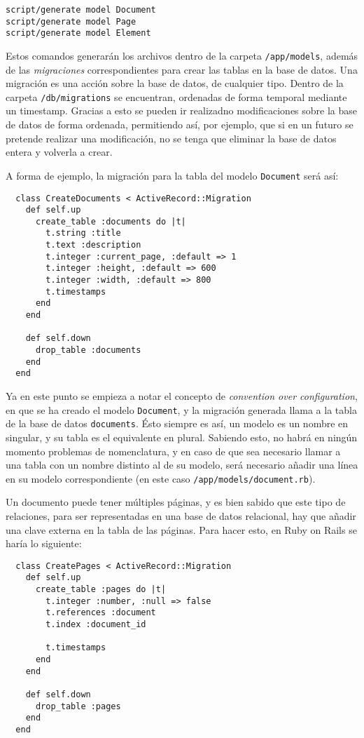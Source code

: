 \begin{verbatim}
script/generate model Document
script/generate model Page
script/generate model Element
\end{verbatim}

Estos comandos generarán los archivos dentro de la carpeta \texttt{/app/models}, además de las \emph{migraciones} correspondientes para crear las tablas en la base de datos. Una migración es una acción sobre la base de datos, de cualquier tipo. Dentro de la carpeta \texttt{/db/migrations} se encuentran, ordenadas de forma temporal mediante un timestamp. Gracias a esto se pueden ir realizadno modificaciones sobre la base de datos de forma ordenada, permitiendo así, por ejemplo, que si en un futuro se pretende realizar una modificación, no se tenga que eliminar la base de datos entera y volverla a crear.

A forma de ejemplo, la migración para la tabla del modelo \texttt{Document} será así:

\begin{verbatim}
  class CreateDocuments < ActiveRecord::Migration
    def self.up
      create_table :documents do |t|
        t.string :title
        t.text :description
        t.integer :current_page, :default => 1
        t.integer :height, :default => 600
        t.integer :width, :default => 800
        t.timestamps
      end
    end

    def self.down
      drop_table :documents
    end
  end
\end{verbatim}

Ya en este punto se empieza a notar el concepto de \emph{convention over configuration}, en que se ha creado el modelo \texttt{Document}, y la migración generada llama a la tabla de la base de datos \texttt{documents}. Ésto siempre es así, un modelo es un nombre en singular, y su tabla es el equivalente en plural. Sabiendo esto, no habrá en ningún momento problemas de nomenclatura, y en caso de que sea necesario llamar a una tabla con un nombre distinto al de su modelo, será necesario añadir una línea en su modelo correspondiente (en este caso \texttt{/app/models/document.rb}).

Un documento puede tener múltiples páginas, y es bien sabido que este tipo de relaciones, para ser representadas en una base de datos relacional, hay que añadir una clave externa en la tabla de las páginas. Para hacer esto, en Ruby on Rails se haría lo siguiente:

\begin{verbatim}
  class CreatePages < ActiveRecord::Migration
    def self.up
      create_table :pages do |t|
        t.integer :number, :null => false
        t.references :document
        t.index :document_id
        
        t.timestamps
      end
    end

    def self.down
      drop_table :pages
    end
  end
\end{verbatim}

